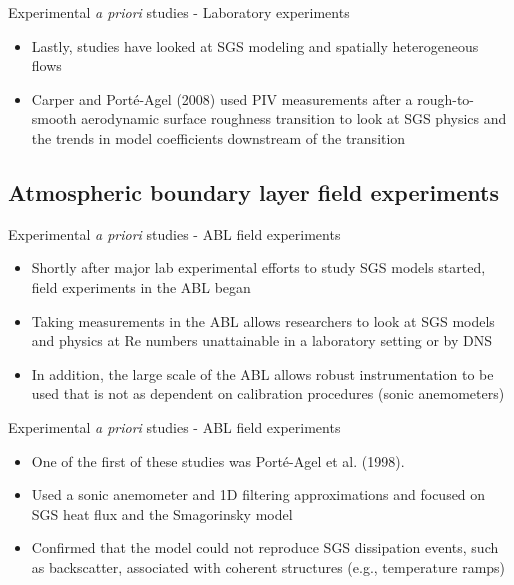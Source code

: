 
\begin{frame}{Experimental {\it a priori} studies - Laboratory experiments}
\begin{itemize}
	\item Lastly, studies have looked at SGS modeling and spatially heterogeneous flows
	\item Carper and Port\'e-Agel (2008) used PIV measurements after a rough-to-smooth aerodynamic surface roughness transition to look at SGS physics and the trends in model coefficients downstream of the transition
	\end{itemize}
\end{frame}

\subsection{Atmospheric boundary layer field experiments}
\begin{frame}{Experimental {\it a priori} studies - ABL field experiments}
\begin{itemize}
	\item Shortly after major lab experimental efforts to study SGS models started, field experiments in the ABL began
	\item Taking measurements in the ABL allows researchers to look at SGS models and physics at Re numbers unattainable in a laboratory setting or by DNS
	\item In addition, the large scale of the ABL allows robust instrumentation to be used that is not as dependent on calibration procedures (sonic anemometers)
	\end{itemize}
\end{frame}

\begin{frame}{Experimental {\it a priori} studies - ABL field experiments}
\begin{itemize}
	\item One of the first of these studies was Port\'e-Agel et al. (1998). 
	\item Used a sonic anemometer and 1D filtering approximations and focused on SGS heat flux and the Smagorinsky model 
	\item Confirmed that the model could not reproduce SGS dissipation events, such as backscatter, associated with coherent structures (e.g., temperature ramps)
	\end{itemize}
\end{frame}

